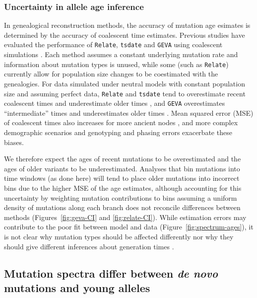 \documentclass[]{article}
\newcommand{\GEVA}{\texttt{GEVA}\xspace}
\newcommand{\tsdate}{\texttt{tsdate}\xspace}
\newcommand{\relate}{\texttt{Relate}\xspace}
\begin{document}
\subsubsection*{Uncertainty in allele age inference}

In genealogical reconstruction methods, the accuracy of mutation age esimates
is determined by the accuracy of coalescent time estimates. Previous studies
have evaluated the performance of \relate, \tsdate and \GEVA using coalescent
simulations \citep{brandt2022evaluation,albers2020dating}. Each method assumes
a constant underlying mutation rate and information about mutation types is
unused, while some (such as \relate) currently allow for population size
changes to be coestimated with the genealogies. For data simulated under
neutral models with constant population size and assuming perfect data, \relate
and \tsdate tend to overestimate recent coalescent times and underestimate
older times \citep{brandt2022evaluation}, and \GEVA overestimates
``intermediate'' times and underestimates older times \citep{albers2020dating}.
Mean squared error (MSE) of coalescent times also increases for more ancient
nodes \citep{brandt2022evaluation}, and more complex demographic scenarios and
genotyping and phasing errors exacerbate these biases.

We therefore expect the ages of recent mutations to be overestimated and the
ages of older variants to be underestimated. Analyses that bin mutations into
time windows (as done here) will tend to place older mutations into incorrect
bins due to the higher MSE of the age estimates, although accounting for this
uncertainty by weighting mutation contributions to bins assuming a uniform
density of mutations along each branch does not reconcile differences between
methods (Figures~\ref{fig:geva-CI} and \ref{fig:relate-CI}). While estimation
errors may contribute to the poor fit between model and data
(Figure~\ref{fig:spectrum-ages}), it is not clear why mutation types should be
affected differently nor why they should give different inferences about
generation times \citep{gao2023limited}.

\subsection*{Mutation spectra differ between \emph{de novo} mutations and young
alleles}
\end{document}
